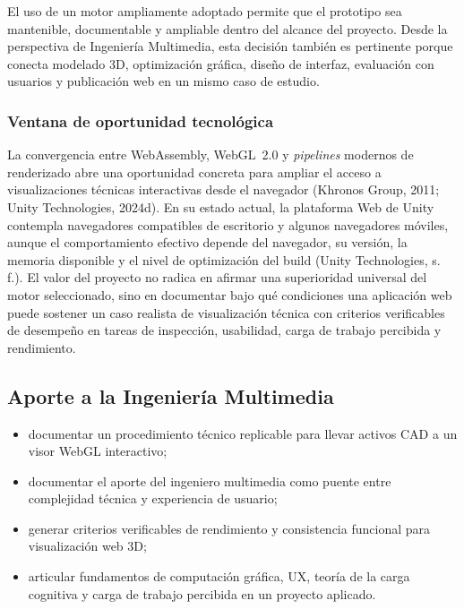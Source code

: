 El uso de un motor ampliamente adoptado permite que el prototipo sea mantenible, documentable y ampliable dentro del alcance del proyecto. Desde la perspectiva de Ingenier\'ia Multimedia, esta decisi\'on tambi\'en es pertinente porque conecta modelado 3D, optimizaci\'on gr\'afica, dise\~no de interfaz, evaluaci\'on con usuarios y publicaci\'on web en un mismo caso de estudio.

\subsubsection{Ventana de oportunidad tecnol\'ogica}

La convergencia entre WebAssembly, WebGL~2.0 y \textit{pipelines} modernos de renderizado abre una oportunidad concreta para ampliar el acceso a visualizaciones t\'ecnicas interactivas desde el navegador (Khronos Group, 2011; Unity Technologies, 2024d). En su estado actual, la plataforma Web de Unity contempla navegadores compatibles de escritorio y algunos navegadores m\'oviles, aunque el comportamiento efectivo depende del navegador, su versi\'on, la memoria disponible y el nivel de optimizaci\'on del build (Unity Technologies, s. f.). El valor del proyecto no radica en afirmar una superioridad universal del motor seleccionado, sino en documentar bajo qu\'e condiciones una aplicaci\'on web puede sostener un caso realista de visualizaci\'on t\'ecnica con criterios verificables de desempe\~no en tareas de inspecci\'on, usabilidad, carga de trabajo percibida y rendimiento.

\subsection{Aporte a la Ingenier\'ia Multimedia}
\begin{itemize}
    \item documentar un procedimiento t\'ecnico replicable para llevar activos CAD a un visor WebGL interactivo;
    \item documentar el aporte del ingeniero multimedia como puente entre complejidad t\'ecnica y experiencia de usuario;
    \item generar criterios verificables de rendimiento y consistencia funcional para visualizaci\'on web 3D;
    \item articular fundamentos de computaci\'on gr\'afica, UX, teor\'ia de la carga cognitiva y carga de trabajo percibida en un proyecto aplicado.
\end{itemize}

\newpage
